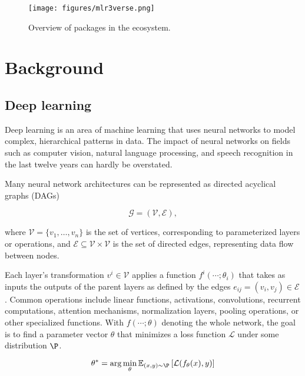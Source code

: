 \documentclass[article]{jss}
\theoremstyle{definition}
\begin{document}
\begin{figure}
    \centering
    \texttt{[image: figures/mlr3verse.png]}
    \caption{Overview of packages in the \mlrt{} ecosystem.}
    \label{fig:mlr3-ecosystem}
\end{figure}

\section{Background}\label{sec:background}


\subsection{Deep learning}\label{sec:background_dl}

Deep learning is an area of machine learning that uses neural networks to model complex, hierarchical patterns in data.
The impact of neural networks on fields such as computer vision, natural language processing, and speech recognition in the last twelve years can hardly be overstated.

Many neural network architectures can be represented as directed acyclical graphs (DAGs)

\begin{equation}
    \mathcal{G} = (\mathcal{V}, \mathcal{E}),
\end{equation}

where $\mathcal{V} = \{v_1, \ldots, v_n\}$ is the set of vertices, corresponding to parameterized layers or operations, and $\mathcal{E} \subseteq \mathcal{V} \times \mathcal{V}$ is the set of directed edges, representing data flow between nodes.

Each layer's transformation $v^i \in \mathcal{V}$ applies a function $f^i(\cdots; \theta_i)$ that takes as inputs the outputs of the parent layers as defined by the edges $e_{ij} = (v_i, v_j) \in \mathcal{E}$.
Common operations include linear functions, activations, convolutions, recurrent computations, attention mechanisms, normalization layers, pooling operations, or other specialized functions.
With $f(\cdots; \theta)$ denoting the whole network, the goal is to find a parameter vector $\theta$ that minimizes a loss function $\mathcal{L}$ under some distribution $\P$.

\begin{equation}
\theta^* = \arg \min_{\theta} \mathbb{E}_{(x, y) \sim \P} \left[ \mathcal{L}(f_{\theta}(x), y) \right]
\end{equation}
\end{document}
